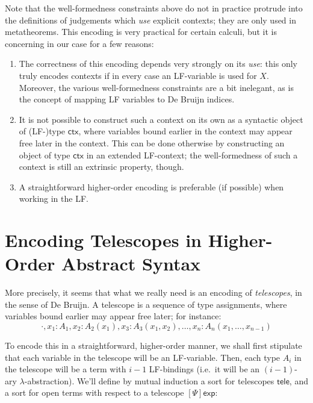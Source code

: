 \documentclass[acmtoplas]{acmtrans2m}
\newcommand\sortexp{\mathsf{exp}}
\newcommand\sortctx{\mathsf{ctx}}
\newcommand\sorttele{\mathsf{tele}}
\newcommand\sortoexp[1]{[#1]\sortexp}
\begin{document}
Note that the well-formedness constraints above do not in practice protrude
into the definitions of judgements which \emph{use} explicit contexts; they are
only used in metatheorems. This encoding is very practical for certain calculi,
but it is concerning in our case for a few reasons:

\begin{enumerate}

  \item The correctness of this encoding depends very strongly on its
    \emph{use}: this only truly encodes contexts if in every case an LF-variable
    is used for $X$.  Moreover, the various well-formedness constraints are a
    bit inelegant, as is the concept of mapping LF variables to De Bruijn indices.

  \item It is not possible to construct such a context on its own as a
    syntactic object of (LF-)type $\sortctx$, where variables bound earlier in
    the context may appear free later in the context. This can be done
    otherwise by constructing an object of type $\sortctx$ in an extended
    LF-context; the well-formedness of such a context is still an extrinsic
    property, though.

  \item A straightforward higher-order encoding is preferable (if possible)
    when working in the LF.

\end{enumerate}

\section{Encoding Telescopes in Higher-Order Abstract Syntax}
More precisely, it seems that what we really need is an encoding of
\emph{telescopes}, in the sense of De Bruijn. A telescope is a
sequence of type assignments, where variables bound earlier may appear free
later; for instance:
\[
  \cdot,x_1:A_1, x_2:A_2(x_1), x_3:A_3(x_1,x_2), \dots, x_n:A_n(x_1,\dots,x_{n-1})
\]

To encode this in a straightforward, higher-order manner, we shall first
stipulate that each variable in the telescope will be an LF-variable. Then,
each type $A_i$ in the telescope will be a term with $i-1$ LF-bindings (i.e.\ it
will be an $(i-1)$-ary $\lambda$-abstraction). We'll define by mutual induction a
sort for telescopes $\sorttele$, and a sort for open terms with respect to a
telescope $\sortoexp{\Psi}$:
\end{document}
